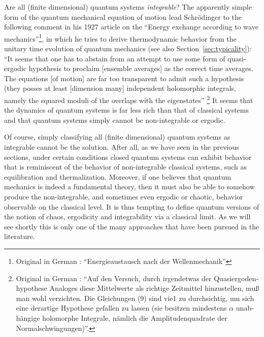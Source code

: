 \documentclass[a4paper,12pt,listof=totoc,index=totoc,bibliography=totoc,headsepline=false,headings=normal,BCOR16.153846mm,DIV12,headinclude,twoside,cleardoublepage=empty,numbers=noenddot,final]{scrreprt}
\theoremstyle{mystyle}
\numberwithin{equation}{section}
\numberwithin{figure}{section}
\numberwithin{lemma}{section}
\numberwithin{theorem}{section}
\numberwithin{corollary}{section}
\numberwithin{definition}{section}
\numberwithin{conjecture}{section}
\numberwithin{observation}{section}
\newcommand{\+}{\mkern2mu}
\DeclareMathOperator{\1}{\mathds{1}}
\begin{document}
Are all (finite dimensional) quantum systems \emph{integrable}?
The apparently simple form of the quantum mechanical equation of motion lead Schrödinger to the following comment in his 1927 article on the ``Energy exchange according to wave mechanics''\footnote{Original in German \cite{Schroedinger1927}: \foreignlanguage{ngerman}{``Energieaustausch nach der Wellenmechanik''}}, in which he tries to derive thermodynamic behavior from the unitary time evolution of quantum mechanics (see also Section~\ref{sec:typicality}):
``It seems that one has to abstain from an attempt to use some form of quasi-ergodic hypothesis to proclaim [ensemble averages] as the correct time averages. The equations [of motion] are far too transparent to admit such a hypothesis (they posses at least [dimension many] independent holomorphic integrals, namely the squared moduli of the overlaps with the eigenstates''%
\footnote{Original in German \cite{Schroedinger1927}: \foreignlanguage{ngerman}{``Auf den Versuch, durch irgendetwas der Quasiergodenhypothese Analoges diese Mittelwerte als richtige Zeitmittel hinzustellen, muß man wohl verzichten. Die Gleichungen (9) sind vie1 zu durchsichtig, um sich eine derartige Hypothese gefallen zu lassen (sie besitzen mindestens $\alpha$ unabhängige holomorphe Integrale, nämlich die Amplitudenquadrate der \glqq{}Normalschwingungen\grqq{})''.}}
It seems that the dynamics of quantum systems is far less rich than that of classical systems and that quantum systems simply cannot be non-integrable or ergodic.

Of course, simply classifying all (finite dimensional) quantum systems as integrable cannot be the solution.
After all, as we have seen in the previous sections, under certain conditions closed quantum systems can exhibit behavior that is reminiscent of the behavior of non-integrable classical systems, such as equilibration and thermalization.
Moreover, if one believes that quantum mechanics is indeed a fundamental theory, then it must also be able to somehow produce the non-integrable, and sometimes even ergodic or chaotic, behavior observable on the classical level.
It is thus tempting to define quantum versions of the notion of chaos, ergodicity and integrability via a classical limit.
As we will see shortly this is only one of the many approaches that have been pursued in the literature. 
\end{document}
